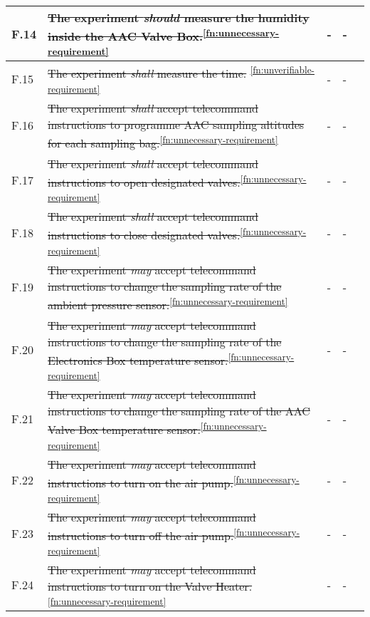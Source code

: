 \begin{longtable}[]{|m{}| m{} |m{} |m{}|m{}|}
F.14 & \st{The experiment \textit{should} measure the humidity inside the AAC Valve Box.}\textsuperscript{\ref{fn:unnecessary-requirement}} & -&- & \\ \hline
F.15 & \st{The experiment \textit{shall} measure the time.} \textsuperscript{\ref{fn:unverifiable-requirement}}&- &-&\\ \hline
F.16 & \st{The experiment \textit{shall} accept telecommand instructions to programme AAC sampling altitudes for each sampling bag.}\textsuperscript{\ref{fn:unnecessary-requirement}} &- &- &\\ \hline
F.17 & \st{The experiment \textit{shall} accept telecommand instructions to open designated valves.}\textsuperscript{\ref{fn:unnecessary-requirement}} &- &- & \\ \hline
F.18 & \st{The experiment \textit{shall} accept telecommand instructions to close designated valves.}\textsuperscript{\ref{fn:unnecessary-requirement}} &- &- & \\ \hline
F.19 & \st{The experiment \textit{may} accept telecommand instructions to change the sampling rate of the ambient pressure sensor.}\textsuperscript{\ref{fn:unnecessary-requirement}} &- &- & \\ \hline
F.20 & \st{The experiment \textit{may} accept telecommand instructions to change the sampling rate of the Electronics Box temperature sensor.}\textsuperscript{\ref{fn:unnecessary-requirement}} &- &- & \\ \hline
F.21 & \st{The experiment \textit{may} accept telecommand instructions to change the sampling rate of the AAC Valve Box temperature sensor.}\textsuperscript{\ref{fn:unnecessary-requirement}}& -&-&\\ \hline
F.22 & \st{The experiment \textit{may} accept telecommand instructions to turn on the air pump.}\textsuperscript{\ref{fn:unnecessary-requirement}}                                                                                              &      -        & -            &        \\ \hline
F.23 & \st{The experiment \textit{may} accept telecommand instructions to turn off the air pump.}\textsuperscript{\ref{fn:unnecessary-requirement}}                                                                                             &      -       & -            &        \\ \hline
F.24 & \st{The experiment \textit{may} accept telecommand instructions to turn on the Valve Heater.}\textsuperscript{\ref{fn:unnecessary-requirement}}                                                                                          &      -        & -            &        \\ \hline

\end{longtable}
